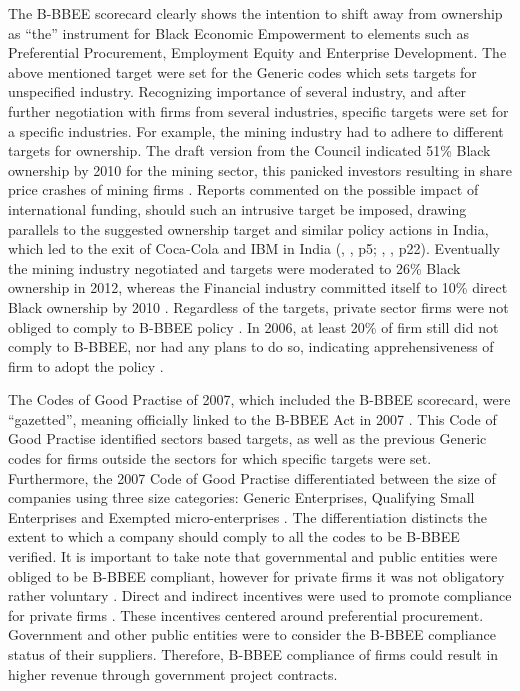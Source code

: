 The B-BBEE scorecard clearly shows the intention to shift away from ownership as “the” instrument for Black Economic Empowerment to elements such as Preferential Procurement, Employment Equity and Enterprise Development. The above mentioned target were set for the Generic codes which sets targets for unspecified industry. Recognizing importance of several industry, and after further negotiation with firms from several industries, specific targets were set for a specific industries. For example, the mining industry had to adhere to different targets for ownership. The draft version from the Council indicated 51\% Black ownership by 2010 for the mining sector, this panicked investors resulting in share price crashes of mining firms \cite[p9]{N23}. Reports commented on the possible impact of international funding, should such an intrusive target be imposed, drawing parallels to the suggested ownership target and similar policy actions in India, which led to the exit of Coca-Cola and IBM in India (\citeauthor{N62}, \citeyear{N62}, p5; \citeauthor{N6}, \citeyear{N6}, p22). Eventually the mining industry negotiated and targets were moderated to 26\% Black ownership in 2012, whereas the Financial industry committed itself to 10\% direct Black ownership by 2010 \cite[p9]{N23}. Regardless of the targets, private sector firms were not obliged to comply to B-BBEE policy \cite[p682]{N42}. In 2006, at least 20\% of firm still did not comply to B-BBEE, nor had any plans to do so, indicating apprehensiveness of firm to adopt the policy \cite[p23]{N6}.

The Codes of Good Practise of 2007, which included the B-BBEE scorecard, were “gazetted”, meaning officially linked to the B-BBEE Act in 2007 \cite[p16]{N6}. This Code of Good Practise identified sectors based targets, as well as the previous Generic codes for firms outside the sectors for which specific targets were set. Furthermore, the 2007 Code of Good Practise differentiated between the size of companies using three size categories: Generic Enterprises, Qualifying Small Enterprises and Exempted micro-enterprises \cite[p38]{N4}. The differentiation distincts the extent to which a company should comply to all the codes to be B-BBEE verified. It is important to take note that governmental and public entities were obliged to be B-BBEE compliant, however for private firms it was not obligatory rather voluntary \cite[p682]{N42}. Direct and indirect incentives were used to promote compliance for private firms \cite[p682]{N42}. These incentives centered around preferential procurement. Government and other public entities were to consider the B-BBEE compliance status of their suppliers. Therefore, B-BBEE compliance of firms could result in higher revenue through government project contracts.

